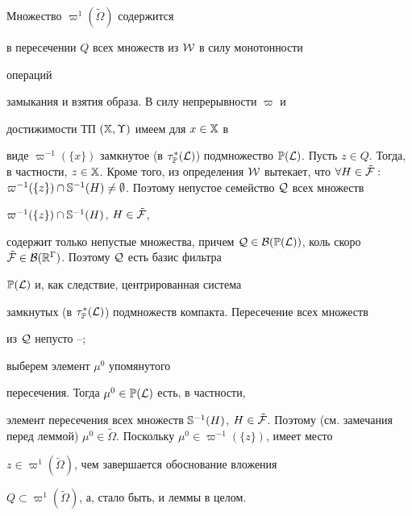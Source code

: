 \begin{pf} Множество $\varpi^1(\tilde\Omega)$ содержится


в пересечении $Q$ всех множеств из ${\cal W}$ в силу монотонности


операций


замыкания и взятия образа. В силу непрерывности $\varpi$ и


достижимости ТП $({\Bbb X}, \Upsilon)$ имеем для $x \in {\Bbb X}$ в


виде $\varpi^{-1}(\{x\})$ замкнутое (в $\tap$) подмножество ${\Bbb


P}({\cal L})$. Пусть $z \in Q$. Тогда, в частности, $z \in {\Bbb


X}$. Кроме того, из определения ${\cal W}$ вытекает, что $\forall H


\in \tilde{\cal F}:$ $\varpi^{-1}(\{z\}) \cap {\Bbb S}^{-1}(H) \ne


\emp$. Поэтому непустое семейство ${\cal Q}$ всех множеств


$\varpi^{-1}(\{z\}) \cap {\Bbb S}^{-1}(H)$, $H \in \tilde{\cal F}$,


содержит только непустые множества, причем ${\cal Q} \in {\cal


B}({\Bbb P}({\cal L}))$, коль скоро $\tilde{\cal F} \in {\cal


B}({\Bbb R}^\Gamma)$. Поэтому ${\cal Q}$ есть базис фильтра


${\Bbb P}({\cal L})$ и, как следствие, центрированная система


замкнутых (в $\tau^*_{\Bbb P}({\cal L})$) подмножеств компакта. Пересечение всех множеств


из ${\cal Q}$ непусто \cite{Kel}--\cite{Ale};


выберем элемент $\mu^0$ упомянутого


пересечения. Тогда $\mu^0 \in {\Bbb P}({\cal L})$ есть, в частности,


элемент пересечения всех множеств ${\Bbb S}^{-1}(H)$, $H


\in \tilde{\cal F}$. Поэтому (см. замечания перед леммой) $\mu^0 \in


\tilde\Omega$. Поскольку $\mu^0 \in \varpi^{-1}(\{z\})$, имеет место


$z \in \varpi^1(\tilde\Omega)$, чем завершается обоснование вложения


$Q \subset \varpi^1(\tilde\Omega)$, а, стало быть, и леммы в целом.


\end{pf}





